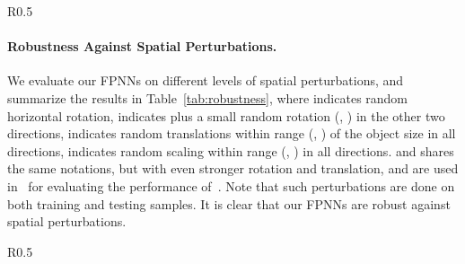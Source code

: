 \documentclass{article}
\begin{document}
\begin{wraptable}{R}{0.5\linewidth}
\vspace{-0.9cm}
	\begin{center}
	\end{center}
	\vspace{-0.3cm}
	\caption{Performance on different perturbations.}
	\label{tab:robustness}
	\vspace{-0.5cm}
\end{wraptable}

\paragraph{Robustness Against Spatial Perturbations.} We evaluate our FPNNs on different levels of spatial perturbations, and summarize the results in Table~\ref{tab:robustness}, where  indicates random horizontal rotation,  indicates  plus a small random rotation (, ) in the other two directions,  indicates random translations within range (, ) of the object size in all directions,  indicates random scaling within range (, ) in all directions.  and  shares the same notations, but with even stronger rotation and translation, and are used in~\cite{qi2016volumetric} for evaluating the performance of~\cite{WU_CVPR15_3D}. Note that such perturbations are done on both training and testing samples. It is clear that our FPNNs are robust against spatial perturbations.

\begin{wraptable}{R}{0.5\linewidth}
\vspace{-1.2cm}
	\begin{center}
	\end{center}
	\vspace{-0.3cm}
	\caption{Performance with different filter spans.}
	\label{tab:long_range}
	\vspace{-0.4cm}
\end{wraptable}
\end{document}
